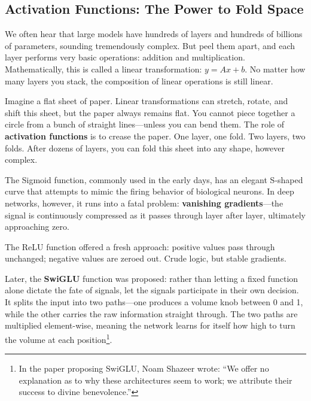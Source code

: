 \subsection{Activation Functions: The Power to Fold Space}

We often hear that large models have hundreds of layers and hundreds of billions of parameters, sounding tremendously complex. But peel them apart, and each layer performs very basic operations: addition and multiplication. Mathematically, this is called a linear transformation: $y = Ax + b$. No matter how many layers you stack, the composition of linear operations is still linear.

\vspace{1em}

Imagine a flat sheet of paper. Linear transformations can stretch, rotate, and shift this sheet, but the paper always remains flat. You cannot piece together a circle from a bunch of straight lines---unless you can bend them. The role of \textbf{activation functions} is to crease the paper. One layer, one fold. Two layers, two folds. After dozens of layers, you can fold this sheet into any shape, however complex.

\vspace{1em}

The Sigmoid function, commonly used in the early days, has an elegant S-shaped curve that attempts to mimic the firing behavior of biological neurons. In deep networks, however, it runs into a fatal problem: \textbf{vanishing gradients}---the signal is continuously compressed as it passes through layer after layer, ultimately approaching zero.

The ReLU function offered a fresh approach: positive values pass through unchanged; negative values are zeroed out. Crude logic, but stable gradients.

\vspace{1em}

Later, the \textbf{SwiGLU} function was proposed: rather than letting a fixed function alone dictate the fate of signals, let the signals participate in their own decision. It splits the input into two paths---one produces a volume knob between 0 and 1, while the other carries the raw information straight through. The two paths are multiplied element-wise, meaning the network learns for itself how high to turn the volume at each position\footnote{In the paper proposing SwiGLU, Noam Shazeer wrote: ``We offer no explanation as to why these architectures seem to work; we attribute their success to divine benevolence.''}.

